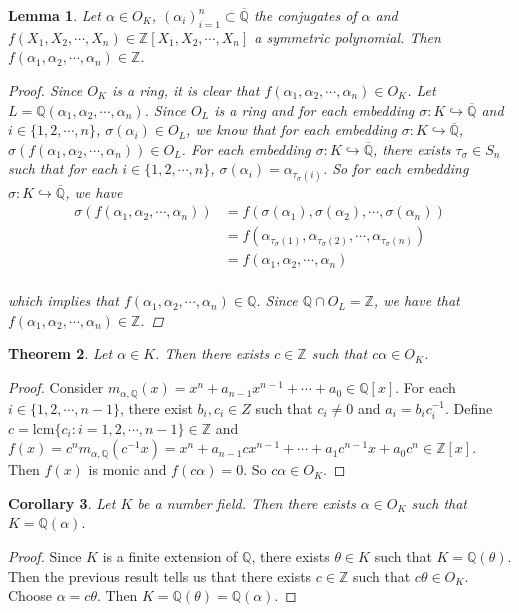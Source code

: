 \documentclass[12pt]{amsart}
\newtheorem{thm}{Theorem}[subsection]
\newtheorem{lem}[thm]{Lemma}
\newtheorem{cor}[thm]{Corollary}
\theoremstyle{definition}
\theoremstyle{remark}
\theoremstyle{definition}
\newcommand{\al}{\alpha}
\newcommand{\sig}{\sigma}
\newcommand{\Z}{\mathbb{Z}}
\newcommand{\Q}{\mathbb{Q}}
\begin{document}
\begin{lem}
Let $\al \in O_K$, $(\al_i)_{i=1}^n \subset \overline{\Q}$ the conjugates of $\al$ and $f(X_1, X_2,\cdots, X_n) \in \Z[X_1, X_2,\cdots, X_n]$ a symmetric polynomial. Then $f(\al_1, \al_2, \cdots, \al_n) \in \Z$.

\begin{proof}
Since $O_K$ is a ring, it is clear that $f(\al_1, \al_2, \cdots, \al_n) \in O_K$. Let $L = \Q(\al_1, \al_2, \cdots, \al_n)$. Since $O_L$ is a ring and for each embedding $\sig : K \hookrightarrow \overline{\Q}$ and $i \in \{1,2,\cdots,n\}$, $\sig(\al_i) \in O_L$, we know that for each embedding $\sig : K \hookrightarrow \overline{\Q}$, $\sig(f(\al_1, \al_2, \cdots, \al_n)) \in O_L$. For each embedding $\sig : K \hookrightarrow \overline{\Q}$, there exists $\tau_\sig \in S_n$ such that for each $i \in \{1,2,\cdots, n\}$, $\sig(\al_i) = \al_{\tau_{\sig}(i)}$. So for each embedding $\sig : K \hookrightarrow \overline{\Q}$, we have
\begin{align*}
\sig(f(\al_1, \al_2, \cdots, \al_n))
&= f(\sig(\al_1),\sig(\al_2), \cdots, \sig(\al_n)) \\
&= f(\al_{\tau_{\sig}(1)}, \al_{\tau_{\sig}(2)},\cdots, \al_{\tau_{\sig}(n)})\\
&= f(\al_1, \al_2, \cdots, \al_n) \\
\end{align*}

which implies that $f(\al_1, \al_2, \cdots, \al_n) \in \Q$. Since $\Q \cap O_L = \Z$, we have that $f(\al_1, \al_2, \cdots, \al_n) \in \Z$.
\end{proof}
\end{lem}

\begin{thm}
Let $\al \in K$. Then there exists $c \in \Z$ such that $c\al \in O_K$.
\end{thm}

\begin{proof}
Consider $m_{\al, \Q}(x) = x^n + a_{n-1}x^{n-1} + \cdots + a_0 \in \Q[x]$. For each $i \in \{1,2,\cdots,n-1\}$, there exist $b_i, c_i \in Z$ such that $c_i \neq 0$ and $a_i=b_ic_i^{-1}$. Define $c = \text{lcm} \{c_i:i=1,2,\cdots,n-1\} \in \Z$ and $f(x) = c^nm_{\al,\Q}(c^{-1}x) = x^n + a_{n-1}cx^{n-1} + \cdots+ a_1c^{n-1}x + a_0c^n \in \Z[x]$. Then $f(x)$ is monic and $f(c\al) =0$. So $c \al \in O_K$. 
\end{proof}

\begin{cor}
Let $K$ be a number field. Then there exists $\al \in O_K$ such that $K=\Q(\al)$. 
\end{cor}

\begin{proof}
Since $K$ is a finite extension of $\Q$, there exists $\theta \in K$ such that $K = \Q(\theta)$. Then the previous result tells us that there exists $c \in \Z$ such that $c\theta \in O_K$. Choose $\al = c\theta$. Then $K = \Q(\theta) = \Q(\al)$.
\end{proof}
\end{document}
